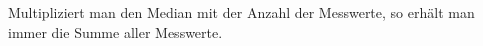 
Multipliziert man den Median mit der Anzahl der Messwerte, so erhält man immer die Summe aller Messwerte.

